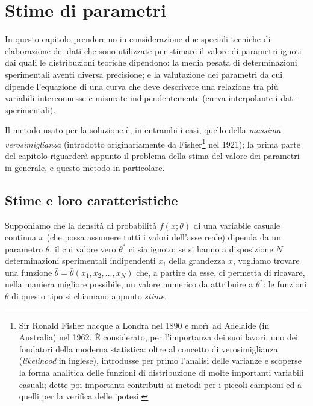 
\chapter{Stime di parametri}%
\label{ch:11.teldat}
In questo capitolo prenderemo in considerazione due speciali
tecniche di elaborazione dei dati che sono utilizzate per
stimare il valore di parametri ignoti dai quali le
distribuzioni teoriche dipendono: la media pesata di
determinazioni sperimentali aventi diversa precisione; e la
valutazione dei parametri da cui dipende l'equazione di una
curva che deve descrivere una relazione tra pi\`u variabili
interconnesse e misurate indipendentemente (curva
interpolante i dati sperimentali).

Il metodo usato per la soluzione \`e, in entrambi i casi,
quello della \emph{massima verosimiglianza} (introdotto
originariamente da Fisher\/\footnote{Sir Ronald Fisher
  nacque a Londra nel 1890 e mor\`\i\ ad Adelaide (in
  Australia) nel 1962.  \`E considerato, per l'importanza
  dei suoi lavori, uno dei fondatori della moderna
  statistica: oltre al concetto di verosimiglianza
  (\emph{likelihood} in inglese), introdusse per primo
  l'analisi delle varianze e scoperse la forma analitica
  delle funzioni di distribuzione di molte importanti
  variabili casuali; dette poi importanti contributi ai
  metodi per i piccoli campioni ed a quelli per la verifica
  delle ipotesi.}%
nel 1921); la prima parte del capitolo riguarder\`a appunto
il problema della stima del valore dei parametri in
generale, e questo metodo in particolare.

\section{Stime e loro caratteristiche}%
%
\label{ch:11.sticar}
Supponiamo che la densit\`a di probabilit\`a $f(x;\theta)$
di una variabile casuale continua $x$ (che possa assumere
tutti i valori dell'asse reale) dipenda da un parametro
$\theta$, il cui valore vero $\theta^*$ ci sia ignoto; se si
hanno a disposizione $N$ determinazioni sperimentali
indipendenti $x_i$ della grandezza $x$, vogliamo trovare una
funzione $\bar \theta = \bar \theta(x_1, x_2,\ldots,x_N)$
che, a partire da esse, ci permetta di ricavare, nella
maniera migliore possibile, un valore numerico da attribuire
a $\theta^*$: le funzioni $\bar \theta$ di questo tipo si
chiamano appunto \emph{stime}.

